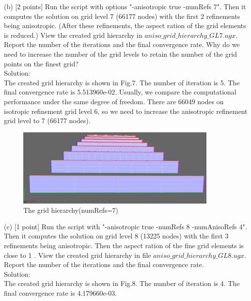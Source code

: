 \documentclass[a4paper]{article}
\begin{document}
\noindent (b) [2 points] Run the script with options "-anisotropic true -numRefs 7". Then it computes the solution on grid level 7 (66177 nodes) with the first 2 refinements being anisotropic. (After these refinements, the aspect ration of the grid elements is reduced.) View the created grid hierarchy in $aniso\_grid\_hierarchy\_GL7.ugx$. Report the number of the iterations and the final convergence rate. Why do we need to increase the number of the grid levels to retain the number of the grid points on the finest grid?\\

\noindent Solution:\\
\noindent The created grid hierarchy is shown in Fig.7. The number of iteration is 5. The final convergence rate is 5.513960e-02. Usually, we compare the computational performance under the same degree of freedom. There are 66049 nodes on isotropic refinement grid level 6, so we need to increase the anisotropic refinement grid level to 7 (66177 nodes).\\

\begin{figure}[htbp]
	\centering
	\begin{minipage}[t]{0.7\textwidth}
		\centering		\includegraphics[width=10cm]{grid7.png}
		\caption{The grid hierarchy(numRefs=7)}
	\end{minipage}
\end{figure}

\noindent (c) [1 point] Run the script with "-anisotropic true -numRefs 8 -numAnisoRefs 4". Then it computes the solution on grid level 8 (13225 nodes) with the first 3 refinements being anisotropic. Then the aspect ration of the fine grid elements is close to 1 . View the created grid hierarchy in file $aniso\_grid\_hierarchy\_GL8.ugx$. Report the number of the iterations and the final convergence rate.\\

\noindent Solution:\\
\noindent The created grid hierarchy is shown in Fig.8. The number of iteration is 4. The final convergence rate is 4.179660e-03.\\
\end{document}
